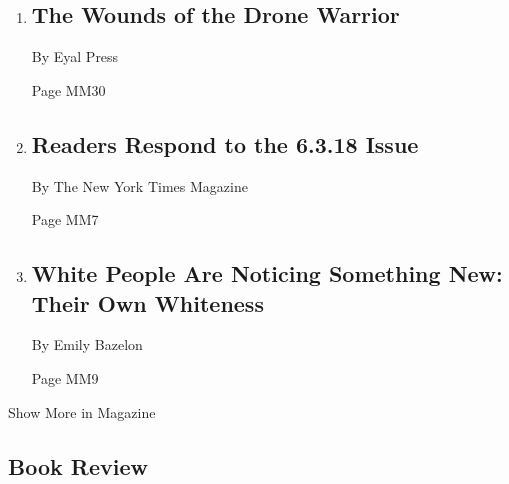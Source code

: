 \begin{enumerate}
\def\labelenumi{\arabic{enumi}.}
\item
  \href{/2018/06/13/magazine/veterans-ptsd-drone-warrior-wounds.html}{}

  \hypertarget{the-wounds-of-the-drone-warrior}{%
  \subsection{The Wounds of the Drone
  Warrior}\label{the-wounds-of-the-drone-warrior}}

  By Eyal Press

  Page MM30
\item
  \href{/2018/06/13/magazine/readers-respond-to-the-6-318-issue.html}{}

  \hypertarget{readers-respond-to-the-6318-issue}{%
  \subsection{Readers Respond to the 6.3.18
  Issue}\label{readers-respond-to-the-6318-issue}}

  By The New York Times Magazine

  Page MM7
\item
  \href{/2018/06/13/magazine/white-people-are-noticing-something-new-their-own-whiteness.html}{}

  \hypertarget{white-people-are-noticing-something-new-their-own-whiteness}{%
  \subsection{White People Are Noticing Something New: Their Own
  Whiteness}\label{white-people-are-noticing-something-new-their-own-whiteness}}

  By Emily Bazelon

  Page MM9
\end{enumerate}

Show More in Magazine

\hypertarget{book-review}{%
\subsection{Book Review}\label{book-review}}

